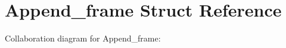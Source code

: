 \hypertarget{structAppend__frame}{}\section{Append\+\_\+frame Struct Reference}
\label{structAppend__frame}


Collaboration diagram for Append\+\_\+frame\+:
